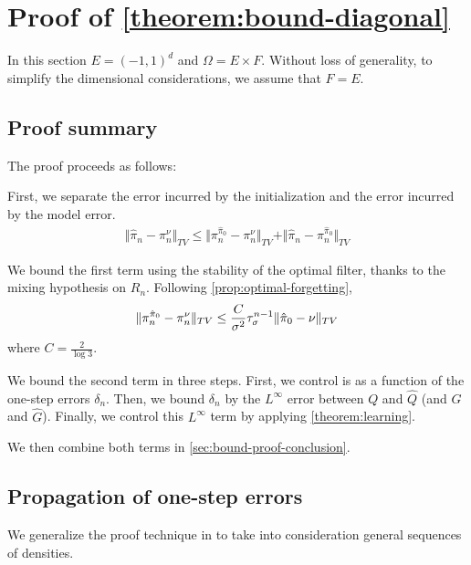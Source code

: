 \section{Proof of \cref{theorem:bound-diagonal}}\label{sec:proof-bound}
In this section $E = (-1, 1)^d$ and $\Omega = E \times F$. Without loss of generality, to simplify the dimensional considerations, we assume that $F=E$.

\subsection{Proof summary}

The proof proceeds as follows:

First, we separate the error incurred by the initialization and the error incurred by the model error.
\begin{align}
\Vert \hat \pi_n - \pi_n^\nu \Vert_{TV} \leq  \Vert \pi_n^{\hat \pi_0} - \pi_n^\nu\Vert_{TV} + \Vert \hat \pi_n - \pi_n^{\hat \pi_0}\Vert_{TV}
\end{align}

We bound the first term using the stability of the optimal filter, thanks to the mixing hypothesis on $R_n$. Following \cref{prop:optimal-forgetting},
\begin{align}
\Vert \pi_n^{\hat \pi_0} - \pi_n^\nu\Vert_{TV} \leq \frac{C}{\sigma^2}\tau_\sigma^{n-1}\Vert \hat \pi_0 - \nu \Vert_{TV}
\end{align} where $C = \frac{2}{\log 3}$.

We bound the second term in three steps. First, we control is as a function of the one-step errors $\delta_n$. Then, we bound $\delta_n$ by the $L^\infty$ error between $Q$ and $\hat Q$ (and $G$ and $\hat G$). Finally, we control this $L^\infty$ term by applying \cref{theorem:learning}.

We then combine both terms in \cref{sec:bound-proof-conclusion}.




\subsection{Propagation of one-step errors}

We generalize the proof technique in \cite{oudjane} to take into consideration general sequences of densities.

